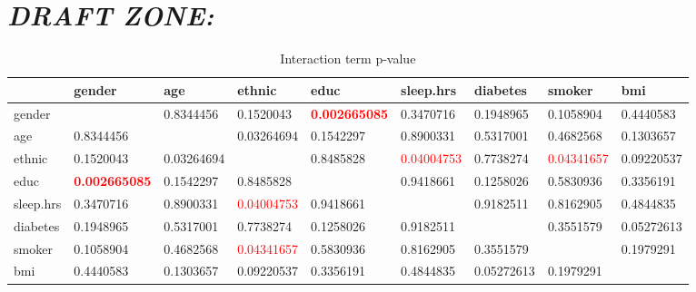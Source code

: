 \documentclass{article}
\begin{document}
\section*{\textit{DRAFT ZONE:}}
\begin{table}[!ht]
\tiny
\centering
\caption{Interaction term p-value }
\begin{tabularx}{\linewidth}{XXXXXXXXX} 
\toprule
~ & gender & age & ethnic & educ & sleep.hrs & diabetes & smoker & bmi \\
\midrule
gender & ~ & 0.8344456 & 0.1520043 & \textcolor{red}{\textbf{0.002665085}} & 0.3470716 & 0.1948965 & 0.1058904 & 0.4440583 \\
age & 0.8344456 & ~ & 0.03264694 & 0.1542297 & 0.8900331 & 0.5317001 & 0.4682568 & 0.1303657 \\  
ethnic & 0.1520043 & 0.03264694 & ~ & 0.8485828 & \textcolor{red}{0.04004753} & 0.7738274 & \textcolor{red}{0.04341657} & 0.09220537 \\
educ & \textcolor{red}{\textbf{0.002665085}} & 0.1542297 & 0.8485828 & ~ & 0.9418661 & 0.1258026 & 0.5830936 & 0.3356191 \\
sleep.hrs & 0.3470716 & 0.8900331 & \textcolor{red}{0.04004753} & 0.9418661 & ~ & 0.9182511 & 0.8162905 & 0.4844835 \\  
diabetes & 0.1948965 & 0.5317001 & 0.7738274 & 0.1258026 & 0.9182511 & ~ & 0.3551579 & 0.05272613 \\
smoker & 0.1058904 & 0.4682568 & \textcolor{red}{0.04341657} & 0.5830936 & 0.8162905 & 0.3551579 & ~ & 0.1979291 \\
bmi & 0.4440583 & 0.1303657 & 0.09220537 & 0.3356191 & 0.4844835 & 0.05272613 & 0.1979291 & ~ \\
\bottomrule
\end{tabularx}
\end{table}
\end{document}
